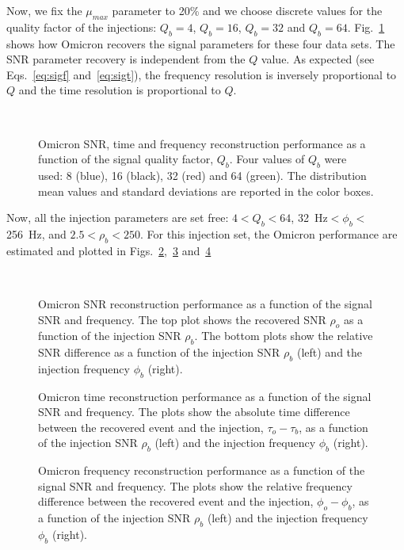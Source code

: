 Now, we fix the $\mu_{max}$ parameter to 20\% and we choose discrete values for the quality factor of the injections: $Q_b=4$, $Q_b=16$, $Q_b=32$ and $Q_b=64$. Fig.~\ref{fig:char_q} shows how Omicron recovers the signal parameters for these four data sets. The SNR parameter recovery is independent from the $Q$ value. As expected (see Eqs.~\ref{eq:sigf} and~\ref{eq:sigt}), the frequency resolution is inversely proportional to $Q$ and the time resolution is proportional to $Q$.
\begin{figure}
  \center
   \\
  \caption{Omicron SNR, time and frequency reconstruction performance as a function of the signal quality factor, $Q_b$. Four values of $Q_b$ were used: 8 (blue), 16 (black), 32 (red) and 64 (green). The distribution mean values and standard deviations are reported in the color boxes.}
  \label{fig:char_q}
\end{figure}

Now, all the injection parameters are set free: $4<Q_b<64$, 32~Hz$<\phi_b<$256~Hz, and $2.5<\rho_b<250$. For this injection set, the Omicron performance are estimated and plotted in Figs.~\ref{fig:char_snr},~\ref{fig:char_time} and~\ref{fig:char_freq}
\begin{figure}
  \center
   \\
  \caption{Omicron SNR reconstruction performance as a function of the signal SNR and frequency. The top plot shows the recovered SNR $\rho_o$ as a function of the injection SNR $\rho_b$. The bottom plots show the relative SNR difference as a function of the injection SNR $\rho_b$ (left) and the injection frequency $\phi_b$ (right).}
  \label{fig:char_snr}
\end{figure}

\begin{figure}
  \center
  \caption{Omicron time reconstruction performance as a function of the signal SNR and frequency. The plots show the absolute time difference between the recovered event and the injection, $\tau_o-\tau_b$, as a function of the injection SNR $\rho_b$ (left) and the injection frequency $\phi_b$ (right).}
  \label{fig:char_time}
\end{figure}


\begin{figure}
  \center
  \caption{Omicron frequency reconstruction performance as a function of the signal SNR and frequency. The plots show the relative frequency difference between the recovered event and the injection, $\phi_o-\phi_b$, as a function of the injection SNR $\rho_b$ (left) and the injection frequency $\phi_b$ (right).}
  \label{fig:char_freq}
\end{figure}

